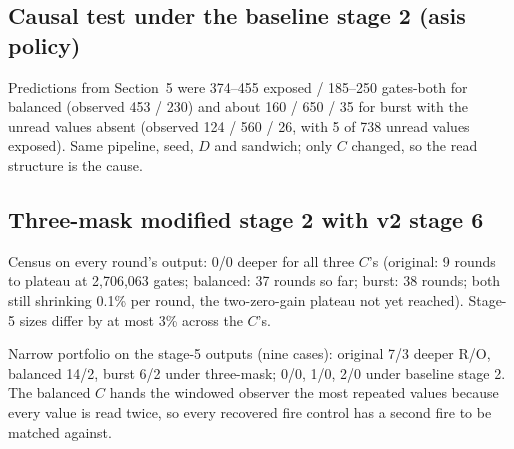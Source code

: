 \documentclass[11pt]{article}
\begin{document}
\subsection{Causal test under the baseline stage 2 (asis policy)}
\begin{center}\footnotesize
{}
\end{center}
Predictions from Section~5 were 374--455 exposed / 185--250 gates-both for balanced (observed 453 / 230) and about 160 / 650 / 35 for burst with the unread values absent (observed 124 / 560 / 26, with 5 of 738 unread values exposed). Same pipeline, seed, $D$ and sandwich; only $C$ changed, so the read structure is the cause.

\subsection{Three-mask modified stage 2 with v2 stage 6}
Census on every round's output: 0/0 deeper for all three $C$'s (original: 9 rounds to plateau at 2,706,063 gates; balanced: 37 rounds so far; burst: 38 rounds; both still shrinking 0.1\% per round, the two-zero-gain plateau not yet reached). Stage-5 sizes differ by at most 3\% across the $C$'s.

Narrow portfolio on the stage-5 outputs (nine cases): original 7/3 deeper R/O, balanced 14/2, burst 6/2 under three-mask; 0/0, 1/0, 2/0 under baseline stage 2. The balanced $C$ hands the windowed observer the most repeated values because every value is read twice, so every recovered fire control has a second fire to be matched against.
\end{document}
